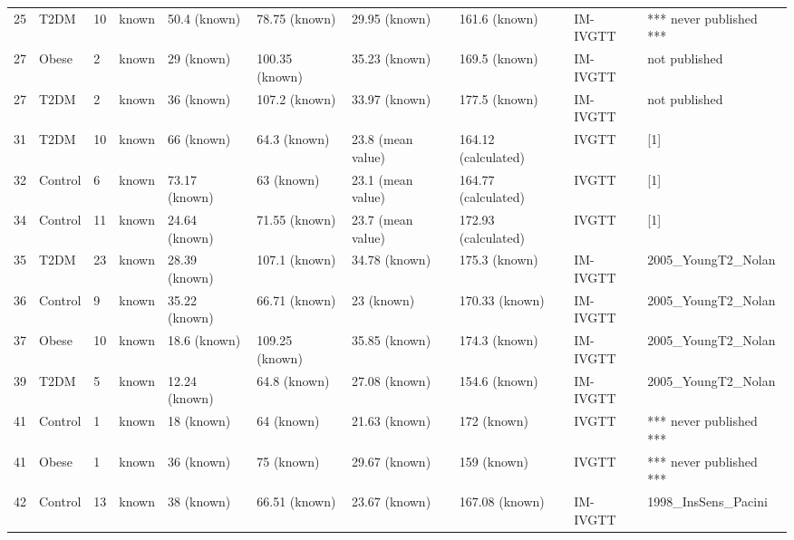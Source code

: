 \documentclass[utf8]{frontiersSCNS} %
\begin{document}
\begin{table}[h]
{\begin{tabular}{llllllllll}
25  & T2DM    & 10 & known             & 50.4 (known)       & 78.75 (known)  & 29.95 (known)      & 161.6 (known)       & IM-IVGTT & *** never published ***    \\
27  & Obese   & 2  & known             & 29 (known)         & 100.35 (known) & 35.23 (known)      & 169.5 (known)       & IM-IVGTT & not published              \\
27  & T2DM    & 2  & known             & 36 (known)         & 107.2 (known)  & 33.97 (known)      & 177.5 (known)       & IM-IVGTT & not published              \\
31  & T2DM    & 10 & known             & 66 (known)         & 64.3 (known)   & 23.8 (mean value)  & 164.12 (calculated) & IVGTT    & {[}1{]}                    \\
32  & Control & 6  & known             & 73.17 (known)      & 63 (known)     & 23.1 (mean value)  & 164.77 (calculated) & IVGTT    & {[}1{]}                    \\
34  & Control & 11 & known             & 24.64 (known)      & 71.55 (known)  & 23.7 (mean value)  & 172.93 (calculated) & IVGTT    & {[}1{]}                    \\
35  & T2DM    & 23 & known             & 28.39 (known)      & 107.1 (known)  & 34.78 (known)      & 175.3 (known)       & IM-IVGTT & 2005\_YoungT2\_Nolan       \\
36  & Control & 9  & known             & 35.22 (known)      & 66.71 (known)  & 23 (known)         & 170.33 (known)      & IM-IVGTT & 2005\_YoungT2\_Nolan       \\
37  & Obese   & 10 & known             & 18.6 (known)       & 109.25 (known) & 35.85 (known)      & 174.3 (known)       & IM-IVGTT & 2005\_YoungT2\_Nolan       \\
39  & T2DM    & 5  & known             & 12.24 (known)      & 64.8 (known)   & 27.08 (known)      & 154.6 (known)       & IM-IVGTT & 2005\_YoungT2\_Nolan       \\
41  & Control & 1  & known             & 18 (known)         & 64 (known)     & 21.63 (known)      & 172 (known)         & IVGTT    & *** never published ***    \\
41  & Obese   & 1  & known             & 36 (known)         & 75 (known)     & 29.67 (known)      & 159 (known)         & IVGTT    & *** never published ***    \\
42  & Control & 13 & known             & 38 (known)         & 66.51 (known)  & 23.67 (known)      & 167.08 (known)      & IM-IVGTT & 1998\_InsSens\_Pacini      \\

\end{tabular}}
\end{table}
\end{document}
